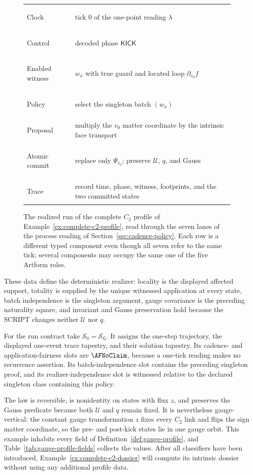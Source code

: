 \begin{example}
\begin{figure}[htbp]
\centering
\small
\renewcommand{\arraystretch}{1.15}
\begin{tabularx}{.94\textwidth}{@{}>{\bfseries\raggedright\arraybackslash}p{}X@{}}
\toprule
Clock & tick $0$ of the one-point reading $\lambda$\\
Control & decoded phase $\mathsf{KICK}$\\
Enabled witness & $w_x$ with true guard and located loop $\partial_{v_0}f$\\
Policy & select the singleton batch $(w_x)$\\
Proposal & multiply the $v_0$ matter coordinate by the intrinsic face transport\\
Atomic commit & replace only $\Psi_{v_0}$; preserve $\mathcal U$, $q$, and Gauss\\
Trace & record time, phase, witness, footprints, and the two committed states\\
\bottomrule
\end{tabularx}
\caption{The realized run of the complete $C_2$ profile of
Example~\ref{ex:complete-c2-profile}, read through the seven lanes of the
process reading of Section~\ref{sec:cadence-policy}.  Each row is a different
typed component even though all seven refer to the same tick; several
components may occupy the same one of the five Artform roles.}
\label{fig:c2-seven-lane-run}
\end{figure}

These data define the deterministic realizer: locality is the displayed
affected support, totality is supplied by the unique witnessed application at
every state, batch independence is the singleton argument, gauge covariance
is the preceding naturality square, and invariant and Gauss preservation hold
because the SCRIPT changes neither $\mathcal U$ nor $q$.

For the run contract take $\mathcal S_0=\mathcal S_{\mathsf G}$.  It assigns
the one-step trajectory, the displayed one-event trace tapestry, and their
solution tapestry.  Its cadence- and application-fairness slots are
$\AFNoClaim$, because a one-tick reading makes no recurrence assertion.  Its
batch-independence slot contains the preceding singleton proof, and its
realizer-independence slot is witnessed relative to the declared singleton
class containing this policy.

The law is reversible, is nonidentity on states with flux $z$, and preserves
the Gauss predicate because both $\mathcal U$ and $q$ remain fixed.  It is
nevertheless gauge-vertical: the constant gauge transformation $z$ fixes every
$C_2$ link and flips the sign matter coordinate, so the pre- and post-kick
states lie in one gauge orbit.  This example inhabits every field of
Definition~\ref{def:gauge-profile}, and Table~\ref{tab:gauge-profile-fields}
collects the values.  After all classifiers have been
introduced, Example~\ref{ex:complete-c2-dossier} will compute its intrinsic
dossier without using any additional profile data.
\end{example}

